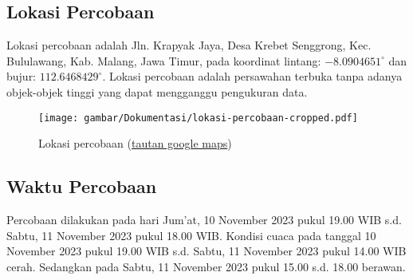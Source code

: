 \subsection{Lokasi Percobaan}
Lokasi percobaan adalah Jln. Krapyak Jaya, Desa Krebet Senggrong, Kec. Bululawang, Kab. Malang, Jawa Timur, pada koordinat lintang: $-8.0904651^\circ$ dan bujur: $112.6468429^\circ$. Lokasi percobaan adalah persawahan terbuka tanpa adanya objek-objek tinggi yang dapat mengganggu pengukuran data.
\begin{figure}[h]
    \centering
    \texttt{[image: gambar/Dokumentasi/lokasi-percobaan-cropped.pdf]}
    \caption{Lokasi percobaan (\href{https://maps.app.goo.gl/vQ3tZS5WpQbmFbkh7}{tautan google maps})}
\end{figure}

\subsection{Waktu Percobaan}
Percobaan dilakukan pada hari Jum'at, 10 November 2023 pukul 19.00 WIB s.d. Sabtu, 11 November 2023 pukul 18.00 WIB. Kondisi cuaca pada tanggal 10 November 2023 pukul 19.00 WIB s.d. Sabtu, 11 November 2023 pukul 14.00 WIB cerah. Sedangkan pada Sabtu, 11 November 2023 pukul 15.00 s.d. 18.00 berawan.

